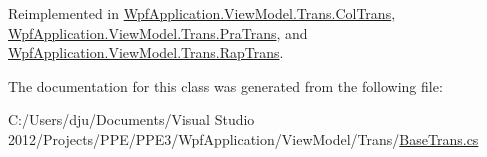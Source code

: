 Reimplemented in \hyperlink{class_wpf_application_1_1_view_model_1_1_trans_1_1_col_trans_aa3df7badaefa8f6adeb0de1147b649bc}{Wpf\-Application.\-View\-Model.\-Trans.\-Col\-Trans}, \hyperlink{class_wpf_application_1_1_view_model_1_1_trans_1_1_pra_trans_a69e0d0034568e424fc88995a8bbfc06c}{Wpf\-Application.\-View\-Model.\-Trans.\-Pra\-Trans}, and \hyperlink{class_wpf_application_1_1_view_model_1_1_trans_1_1_rap_trans_acbc5326d57143463f3d26fe66dab7a14}{Wpf\-Application.\-View\-Model.\-Trans.\-Rap\-Trans}.



The documentation for this class was generated from the following file\-:\begin{DoxyCompactItemize}
\item 
C\-:/\-Users/dju/\-Documents/\-Visual Studio 2012/\-Projects/\-P\-P\-E/\-P\-P\-E3/\-Wpf\-Application/\-View\-Model/\-Trans/\hyperlink{_base_trans_8cs}{Base\-Trans.\-cs}\end{DoxyCompactItemize}
